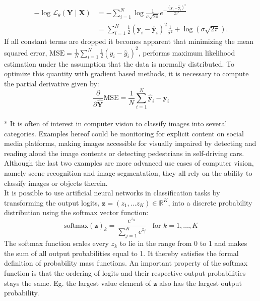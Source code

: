 \documentclass[a4paper,11pt]{article}
\begin{document}
\begin{equation}
  \begin{split} %
  -\log \mathcal{L}_{\theta}(\mathbf{Y} \mid \mathbf{X}) & = -\sum_{i=1}^{N} \log \frac{1}{\sigma \sqrt{2 \pi}} e^{-\frac{(\mathbf{y}_i - \hat{\mathbf{y}}_i)^{2}}{2 \sigma^{2}}} \\ 
  & = \sum_{i=1}^{N} \frac{1}{2}(\mathbf{y}_i - \hat{\mathbf{y}}_i)^2 \frac{1}{\sigma^2} + \log\left( \sigma \sqrt{2\pi} \right).
  \end{split}
\end{equation}
If all constant terms are dropped it becomes apparent that minimizing the mean squared error, $\text{MSE} = \frac{1}{N}\sum_{i=1}^{N} \frac{1}{2}(y_i - \hat{y}_i)^2$, performs maximum likelihood estimation under the assumption that the data is normally distributed. To optimize this quantity with gradient based methods, it is necessary to compute the partial derivative given by:
\begin{equation} \label{eq:regression-loss-deriv}
  \frac{\partial}{\partial \hat{\mathbf{Y}}}\text{MSE} = \frac{1}{N}\sum_{i=1}^{N} \hat{\mathbf{y}}_i - \mathbf{y}_i
\end{equation}
\\*
It is often of interest in computer vision to classify images into several categories. Examples hereof could be monitoring for explicit content on social media platforms, making images accessible for visually impaired by detecting and reading aloud the image contents or detecting pedestrians in self-driving cars. Although the last two examples are more advanced use cases of computer vision, namely scene recognition and image segmentation, they all rely on the ability to classify images or objects therein. \\
It is possible to use artificial neural networks in classification tasks by transforming the output logits, $\mathbf{z} = (z_1, \ldots z_K) \in \mathbb{R}^K$, into a discrete probability distribution using the softmax vector function:
\begin{equation} \label{eq:softmax}
  \text{softmax}(\mathbf{z})_k = \frac{e^{z_k}}{\sum_{j=1}^{K}{e^{z_j}}} \hspace{10pt} \text{for } k = 1,\ldots,K 
\end{equation}
The softmax function scales every $z_k$ to lie in the range from 0 to 1 and makes the sum of all output probabilities equal to 1. It thereby satisfies the formal definition of probability mass functions. An important property of the softmax function is that the ordering of logits and their respective output probabilities stays the same. Eg. the largest value element of $\mathbf{z}$ also has the largest output probability. \\
\end{document}
